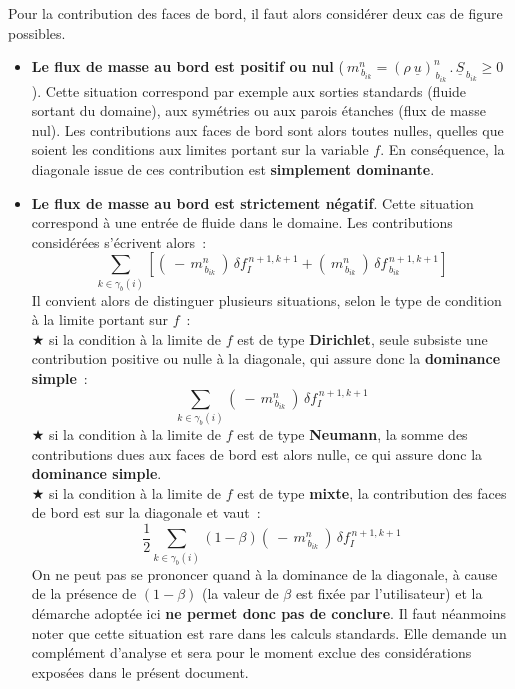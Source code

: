 \hspace*{1cm}Pour la contribution des faces de bord, il faut alors consid\'erer deux cas de
figure possibles.
\begin{itemize}

\item {\bf Le flux de masse au bord est positif ou nul}
($\ m_{\,{b}_{ik}}^n = (\rho\
\underline{u})^{n}_{\,b_{ik}}\,.\,\underline{S}_{\,b_{ik}} \geqslant 0$). Cette
situation correspond par exemple aux sorties standards (fluide sortant du
domaine), aux sym\'etries ou aux parois \'etanches (flux de masse nul). Les contributions aux
faces de bord sont alors toutes nulles, quelles que soient les conditions aux limites
portant sur la variable $f$. En cons\'equence, la diagonale issue de ces
contribution est {\bf simplement dominante}.
\hspace*{0.5cm}
\item {\bf Le flux de masse au bord est strictement n\'{e}gatif}. Cette situation
correspond \`a une entr\'ee de fluide dans
le domaine. Les contributions consid\'er\'ees s'\'ecrivent alors~:
\begin{equation}
\displaystyle\sum\limits_{k\in {\gamma_b(i)}}\left[(\ -\,
m_{\,{b}_{ik}}^n\ )\,\delta f_I^{\,n+1,k+1} + (\
m_{\,{b}_{ik}}^n\ )\,\delta f_{\,{b}_{ik}}^{\,n+1,k+1}\right]
\end{equation}
Il convient alors de distinguer plusieurs situations, selon le type de condition
\`a la limite portant sur $f$~: \\
\hspace*{1.cm} {\tiny$\bigstar$} si la condition \`{a} la limite de $f$ est de type
{\bf Dirichlet}, seule subsiste une contribution positive ou nulle \`{a} la diagonale, qui assure
donc la {\bf dominance simple}~:
\begin{equation}
\displaystyle\sum\limits_{k\in {\gamma_b(i)}}(\ -\,
m_{\,{b}_{ik}}^n\ )\,\delta f_I^{\,n+1,k+1}
\end{equation}
\hspace*{1.cm} {\tiny$\bigstar$} si la condition \`{a} la limite de $f$ est de type
 {\bf Neumann}, la somme des contributions dues aux faces de bord
est alors nulle, ce qui assure
donc la {\bf dominance simple}.\\
\hspace*{1.cm} {\tiny$\bigstar$} si la condition \`{a} la limite de $f$ est de type
{\bf mixte}, la contribution des faces de bord est sur la diagonale et vaut~:
\begin{equation}
\displaystyle \frac{1}{2}\sum\limits_{k \in \gamma_b(i)}(1-\beta)
(\ -\,m_{\,{b}_{ik}}^n\ )\,\delta f_I^{\,n+1,k+1}
\end{equation}
On ne peut pas se prononcer quand \`a la dominance de la diagonale, \`a
cause de la pr\'esence de $(1-\beta)$ (la valeur de $\beta$ est fix\'ee par
l'utilisateur) et la d\'emarche adopt\'ee ici
{\bf ne permet donc pas de conclure}. Il faut n\'eanmoins noter que cette
situation est rare dans les calculs standards. Elle demande un
compl\'ement d'analyse et sera pour le moment exclue des
consid\'{e}rations expos\'ees dans le pr\'esent document.\\
\end{itemize}

